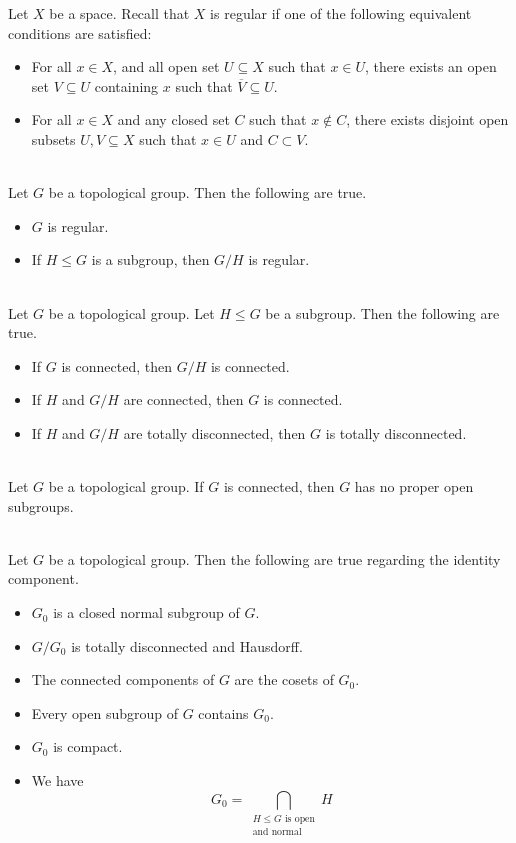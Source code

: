 \documentclass[a4paper]{article}
\begin{document}
Let $X$ be a space. Recall that $X$ is regular if one of the following equivalent conditions are satisfied: 
\begin{itemize}
\item For all $x\in X$, and all open set $U\subseteq X$ such that $x\in U$, there exists an open set $V\subseteq U$ containing $x$ such that $\overline{V}\subseteq U$. 
\item For all $x\in X$ and any closed set $C$ such that $x\notin C$, there exists disjoint open subsets $U,V\subseteq X$ such that $x\in U$ and $C\subset V$. 
\end{itemize}

\begin{prp}{}{}\\
Let $G$ be a topological group. Then the following are true. 
\begin{itemize}
\item $G$ is regular. 
\item If $H\leq G$ is a subgroup, then $G/H$ is regular. 
\end{itemize}
\end{prp}

\begin{prp}{}{}\\
Let $G$ be a topological group. Let $H\leq G$ be a subgroup. Then the following are true. 
\begin{itemize}
\item If $G$ is connected, then $G/H$ is connected. 
\item If $H$ and $G/H$ are connected, then $G$ is connected. 
\item If $H$ and $G/H$ are totally disconnected, then $G$ is totally disconnected. 
\end{itemize}
\end{prp}

\begin{lmm}{}{}\\
Let $G$ be a topological group. If $G$ is connected, then $G$ has no proper open subgroups. 
\end{lmm}

\begin{prp}{}{}\\
Let $G$ be a topological group. Then the following are true regarding the identity component. 
\begin{itemize}
\item $G_0$ is a closed normal subgroup of $G$. 
\item $G/G_0$ is totally disconnected and Hausdorff. 
\item The connected components of $G$ are the cosets of $G_0$. 
\item Every open subgroup of $G$ contains $G_0$. 
\item $G_0$ is compact. 
\item We have $$G_0=\bigcap_{\substack{H\leq G\text{ is open}\\\text{and normal}}}H$$
\end{itemize}
\end{prp}
\end{document}
